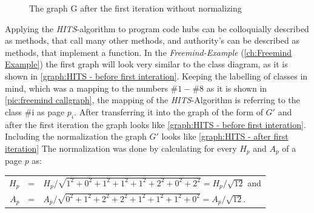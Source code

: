 \begin{figure}
  \caption{The graph G after the first iteration without normalizing}
  \label{graph:HITS - before first interation}
\end{figure}

Applying the \emph{HITS}-algorithm to program code hubs can be colloquially described as methods, that call many other methods, and authority's can be described as methods, that implement a function.\newline
In the \textit{Freemind-Example} (\autoref{ch:Freemind Example}) the first graph will look very similar to the class diagram, as it is shown in \autoref{graph:HITS - before first interation}. Keeping the labelling of classes in mind, which was a mapping to the numbers $\#1-\#8$ as it is shown in \autoref{pic:freemind callgraph}, the mapping of the \textit{HITS}-Algorithm is referring to the class \#i as page $p_i$.
After transferring it into the graph of the form of $G'$ and after the first iteration the graph looks like \autoref{graph:HITS - before first interation}. \newline \newline  
Including the normalization the graph $G'$ looks like \autoref{graph:HITS - after first iteration}
The normalization was done by calculating for every $H_p$ and $A_p$ of a page $p$ as:\newline
\begin{center}
  	\vspace{-2em}
  	\begin{tabular}{ r c l }
  		$H_p$ & = &$H_p / \sqrt{1^2+0^2+1^2+1^2+1^2+2^2+0^2+2^2} = H_p/ \sqrt{12}$ and \\
  		$A_p$ & = &$ A_p / \sqrt{0^2+1^2+2^2+2^2+1^2+1^2+1^2+0^2} = A_p/ \sqrt{12}$. \\
	\end{tabular}
\end{center} 

